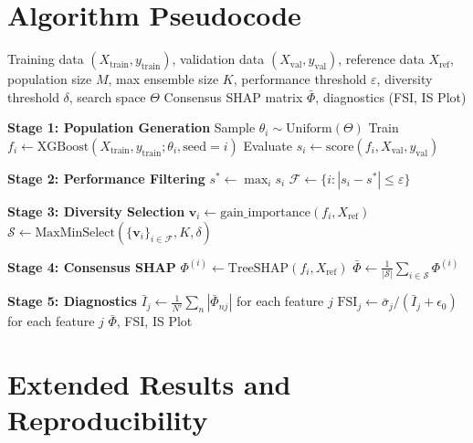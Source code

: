 \documentclass[11pt]{article}
\begin{document}
\appendix

\section{Algorithm Pseudocode}
\label{app:algorithm}

\begin{algorithm}[htbp]
\caption{DASH Pipeline}
\label{alg:dash}
\begin{algorithmic}[1]
\REQUIRE Training data $(X_{\text{train}}, y_{\text{train}})$, validation
  data $(X_{\text{val}}, y_{\text{val}})$, reference data $X_{\text{ref}}$,
  population size $M$, max ensemble size $K$, performance threshold
  $\varepsilon$, diversity threshold $\delta$, search space $\Theta$
\ENSURE Consensus SHAP matrix $\bar{\Phi}$, diagnostics (FSI, IS Plot)

\STATE \textbf{Stage 1: Population Generation}
  \STATE Sample $\theta_i \sim \text{Uniform}(\Theta)$
  \STATE Train $f_i \gets \text{XGBoost}(X_{\text{train}}, y_{\text{train}};
    \theta_i, \text{seed}=i)$
  \STATE Evaluate $s_i \gets \text{score}(f_i, X_{\text{val}}, y_{\text{val}})$
\ENDFOR

\STATE \textbf{Stage 2: Performance Filtering}
\STATE $s^* \gets \max_i s_i$
\STATE $\mathcal{F} \gets \{i : |s_i - s^*| \leq \varepsilon\}$

\STATE \textbf{Stage 3: Diversity Selection}
  \STATE $\mathbf{v}_i \gets \text{gain\_importance}(f_i, X_{\text{ref}})$
\ENDFOR
\STATE $\mathcal{S} \gets \text{MaxMinSelect}(\{\mathbf{v}_i\}_{i \in \mathcal{F}},
  K, \delta)$

\STATE \textbf{Stage 4: Consensus SHAP}
  \STATE $\Phi^{(i)} \gets \text{TreeSHAP}(f_i, X_{\text{ref}})$
\ENDFOR
\STATE $\bar{\Phi} \gets \frac{1}{|\mathcal{S}|} \sum_{i \in \mathcal{S}}
  \Phi^{(i)}$

\STATE \textbf{Stage 5: Diagnostics}
\STATE $\bar{I}_j \gets \frac{1}{N'}\sum_n |\bar{\Phi}_{nj}|$ for each
  feature $j$
\STATE $\text{FSI}_j \gets \bar{\sigma}_j / (\bar{I}_j + \epsilon_0)$ for
  each feature $j$
\RETURN $\bar{\Phi}$, FSI, IS Plot
\end{algorithmic}
\end{algorithm}

\section{Extended Results and Reproducibility}
\label{app:full_sweep}
\end{document}
